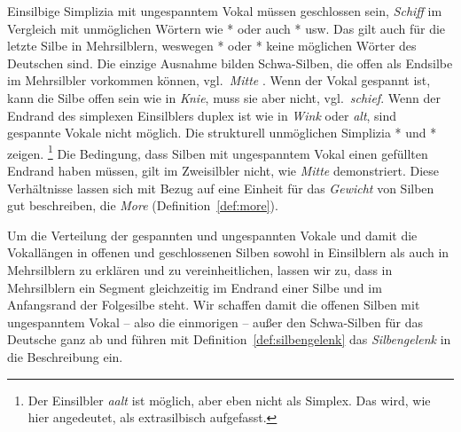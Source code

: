 Einsilbige Simplizia mit ungespanntem Vokal müssen geschlossen sein, \zB \textit{Schiff} im Vergleich mit unmöglichen Wörtern wie *\textipa{[knI]} oder auch *\textipa{[tO]} usw.
Das gilt auch für die letzte Silbe in Mehrsilblern, weswegen *\textipa{[kUn.dI]} oder *\textipa{[tu:.bO]} keine möglichen Wörter des Deutschen sind.
Die einzige Ausnahme bilden Schwa-Silben, die offen als Endsilbe im Mehrsilbler vorkommen können, vgl.\ \textit{Mitte} \textipa{[mi.t@]}.
Wenn der Vokal gespannt ist, kann die Silbe offen sein wie in \textit{Knie}, muss sie aber nicht, vgl.\ \textit{schief}.
Wenn der Endrand des simplexen Einsilblers duplex ist wie in \textit{Wink} oder \textit{alt}, sind gespannte Vokale nicht möglich.
Die strukturell unmöglichen Simplizia *\textipa{[vi:Nk]} und *\textipa{[Pa:lt]} zeigen.%
\footnote{Der Einsilbler \textit{aalt} \textipa{[Pa:l+t]} ist möglich, aber eben nicht als Simplex.
Das \textipa{[t]} wird, wie hier angedeutet, als extrasilbisch aufgefasst.}
Die Bedingung, dass Silben mit ungespanntem Vokal einen gefüllten Endrand haben müssen, gilt im Zweisilbler nicht, wie \textit{Mitte} demonstriert.
Diese Verhältnisse lassen sich mit Bezug auf eine Einheit für das \textit{Gewicht} von Silben gut beschreiben, die \textit{More} (Definition~\ref{def:more}).


Um die Verteilung der gespannten und ungespannten Vokale und damit die Vokallängen in offenen und geschlossenen Silben sowohl in Einsilblern als auch in Mehrsilblern zu erklären und zu vereinheitlichen, lassen wir zu, dass in Mehrsilblern ein Segment gleichzeitig im Endrand einer Silbe und im Anfangsrand der Folgesilbe steht.
Wir schaffen damit die offenen Silben mit ungespanntem Vokal -- also die einmorigen -- außer den Schwa-Silben für das Deutsche ganz ab und führen mit Definition~\ref{def:silbengelenk} das \textit{Silbengelenk} in die Beschreibung ein.


